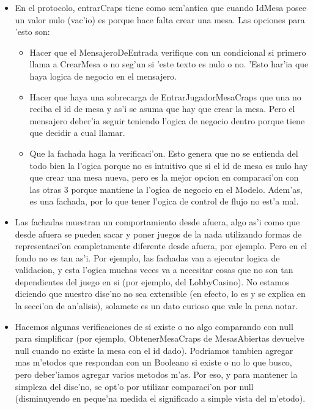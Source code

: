 \begin{itemize}
\item En el protocolo, entrarCraps tiene como sem'antica que cuando IdMesa posee un valor nulo (vac'io) es porque hace falta crear una mesa. Las opciones para 'esto son:
	\begin{itemize}
	\item Hacer que el MensajeroDeEntrada verifique con un condicional si primero llama a CrearMesa o no seg'un si 'este texto es nulo o no. 'Esto har'ia que haya logica de negocio en el mensajero.
	\item Hacer que haya una sobrecarga de EntrarJugadorMesaCraps que una no reciba el id de mesa y as'i se asuma que hay que crear la mesa. Pero el mensajero deber'ia seguir teniendo l'ogica de negocio dentro porque tiene que decidir a cual llamar.
	\item Que la fachada haga la verificaci'on. Esto genera que no se entienda del todo bien la l'ogica porque no es intuitivo que si el id de mesa es nulo hay que crear una mesa nueva, pero es la mejor opcion en comparaci'on con las otras 3 porque mantiene la l'ogica de negocio en el Modelo. Adem'as, es una fachada, por lo que tener l'ogica de control de flujo no est'a mal.
	\end{itemize}

\item Las fachadas muestran un comportamiento  desde afuera, algo as'i como que desde afuera se pueden sacar y poner juegos de la nada utilizando formas de representaci'on completamente diferente desde afuera, por ejemplo. Pero en el fondo no es tan as'i. Por ejemplo, las fachadas van a ejecutar logica de validacion, y esta l'ogica muchas veces va a necesitar cosas que no son tan dependientes del juego en si (por ejemplo, del LobbyCasino). No estamos diciendo que nuestro dise'no no sea extensible (en efecto, lo es y se explica en la secci'on de an'alisis), solamete es un dato curioso que vale la pena notar.

\item Hacemos algunas verificaciones de si existe o no algo comparando con null para simplificar (por ejemplo, ObtenerMesaCraps de MesasAbiertas devuelve null cuando no existe la mesa con el id dado). Podriamos tambien agregar mas m'etodos que respondan con un Booleano si existe o no lo que busco, pero deber'iamos agregar varios metodos m'as. Por eso, y para mantener la simpleza del dise'no, se opt'o por utilizar comparaci'on por null (disminuyendo en peque'na medida el significado a simple vista del m'etodo).


\end{itemize}
